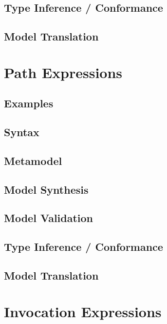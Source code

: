 \documentclass[a4paper,oneside,12pt, extrafontsizes]{memoir}
\begin{document}
    \section{Type Inference / Conformance}
    

    \section{Model Translation}
    

  \chapter{Path Expressions}
  \label{ch:paths}
  

    \section{Examples}
    

    \section{Syntax}

    \section{Metamodel}

    \section{Model Synthesis}

    \section{Model Validation}

    \section{Type Inference / Conformance}

    \section{Model Translation}

  \chapter{Invocation Expressions}
  \label{ch:invocations}
  
\end{document}
